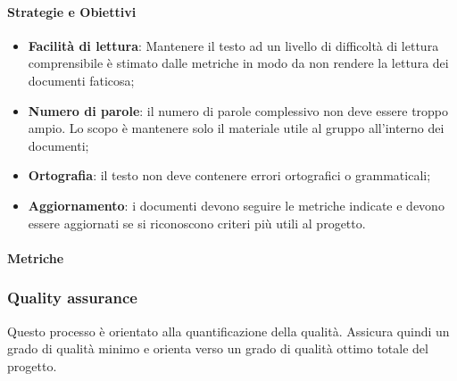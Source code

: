            \paragraph{Strategie e Obiettivi}
            \begin{itemize}
                \item \textbf{Facilità di lettura}: Mantenere il testo ad un livello di difficoltà di lettura comprensibile è stimato dalle metriche in modo da non rendere la lettura dei documenti faticosa;
                \item \textbf{Numero di parole}: il numero di parole complessivo non deve essere troppo ampio. Lo scopo è mantenere solo il materiale utile al gruppo all'interno dei documenti;
                \item \textbf{Ortografia}: il testo non deve contenere errori ortografici o grammaticali;
                \item \textbf{Aggiornamento}: i documenti devono seguire le metriche indicate e devono essere aggiornati se si riconoscono criteri più utili al progetto.
            \end{itemize}
    \newpage
            \paragraph{Metriche}
            
            \hphantom{}
         \def\productquality{
                           {   Gulpease index,
                                $89 + (300*Frasi - 10*\frac{Lettere}{Parole}$, 
                                $40 < IG \leq 100$,
                                $80 < IG \leq 100$
                            },
                            {   Correttezza ortografica,
                                numero totale di errori, 
                                0,
                                0
                            },
                        }
                    
                    
                    
            \subsubsection{Quality assurance}
            Questo processo è orientato alla quantificazione della qualità. Assicura quindi un grado di qualità minimo e orienta verso un grado di qualità ottimo totale del progetto.
            
